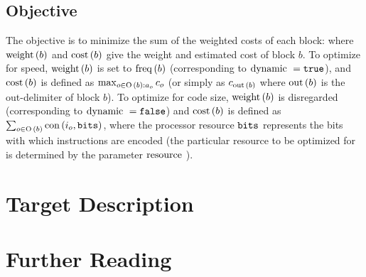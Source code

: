 \documentclass[11pt]{report}
\begin{document}
\section{Objective}\label{sec:objective}

The objective is to minimize the sum of the weighted costs of each block:
%
\genericObjectiveEquation
%
where $\operatorname{weight}\,(b)$ and $\operatorname{cost}\,(b)$ give the weight and estimated cost
of block $b$.
%
To optimize for speed, $\operatorname{weight}\,(b)$ is set to $\operatorname{freq}\,(b)$
(corresponding to $\operatorname{dynamic}\,{}{} = \texttt{true}$), and $\operatorname{cost}\,(b)$ is
defined as $\max_{o \in \operatorname{O}\,(b) :
  a_{o}}{c_{o}}$ (or simply as
$c_{\operatorname{out}\,(b)}$ where $\operatorname{out}\,(b)$ is the
out-delimiter of block $b$).
%
To optimize for code size, $\operatorname{weight}\,(b)$ is disregarded (corresponding to
$\operatorname{dynamic}\,{}{} = \texttt{false}$) and $\operatorname{cost}\,(b)$ is defined as $\sum_{o
  \in \operatorname{O}\,(b)}{\operatorname{con}\,(i_{o}, \mathtt{bits}{})}$, where the
processor resource $\mathtt{bits}{}$ represents the bits with which instructions are
encoded (the particular resource to be optimized for is determined by the
parameter $\operatorname{resource}\,{}{}$).

\chapter{Target Description}
\label{sec:target-description}

\appendix

\chapter{Further Reading}
\label{sec:further-reading}



\end{document}
